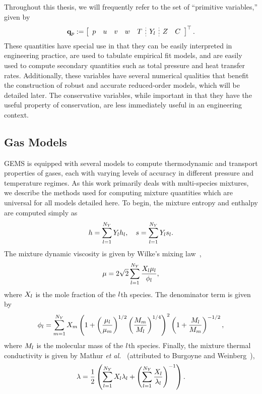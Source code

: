 Throughout this thesis, we will frequently refer to the set of ``primitive variables,'' given by
%
\begin{equation}\label{eq:gemsPrimVec}
    \primVec \defEq \left[
    \begin{array}{ccccc;{2pt/2pt}c;{2pt/2pt}cc}
    \pressure & \velX & \velY & \velZ & \temperature & \mfSpec & \mixFrac & \progVar
    \end{array}
    \right]^\top.
\end{equation}
%
These quantities have special use in that they can be easily interpreted in engineering practice, are used to tabulate empirical fit models, and are easily used to compute secondary quantities such as total pressure and heat transfer rates. Additionally, these variables have several numerical qualities that benefit the construction of robust and accurate reduced-order models, which will be detailed later. The conservative variables, while important in that they have the useful property of conservation, are less immediately useful in an engineering context.

\subsection{Gas Models}\label{subsec:gasModels}

GEMS is equipped with several models to compute thermodynamic and transport properties of gases, each with varying levels of accuracy in different pressure and temperature regimes. As this work primarily deals with multi-species mixtures, we describe the methods used for computing mixture quantities which are universal for all models detailed here. To begin, the mixture entropy and enthalpy are computed simply as
%
\begin{equation}
	h = \sum_{l = 1}^{N_Y} Y_{l} h_{l}, \quad s = \sum_{l = 1}^{N_Y} Y_{l} s_{l}.
\end{equation}
%
The mixture dynamic viscosity is given by Wilke's mixing law~\cite{Wilke1950},
%
\begin{equation}\label{eq:viscMix}
	\mu = 2 \sqrt{2} \sum_{l = 1}^{N_Y} \frac{X_{l} \mu_{l}}{\phi_{l}},
\end{equation}
%
where $X_{l}$ is the mole fraction of the $l$th species. The denominator term is given by
%
\begin{equation}\label{eq:viscMixDenom}
	\phi_{l} = \sum_{m = 1}^{N_Y} X_{m} \left( 1 + \left( \frac{\mu_{l}}{\mu_{m}} \right)^{1/2} \left( \frac{M_{m}}{M_{l}} \right)^{1/4} \right)^2 \left( 1 + \frac{M_{l}}{M_{m}} \right)^{-1/2},
\end{equation}
%
where $M_{l}$ is the molecular mass of the $l$th species. Finally, the mixture thermal conductivity is given by Mathur \textit{et al.}~\cite{Mathur1967} (attributed to Burgoyne and Weinberg~\cite{Burgoyne1952}),
%
\begin{equation}\label{eq:thermCondMix}
    \lambda = \frac{1}{2} \left( \sum_{l = 1}^{N_Y} X_{l} \lambda_{l} + \left(\sum_{l = 1}^{N_Y} \frac{X_{l}}{\lambda_{l}} \right)^{-1} \right).
\end{equation}


